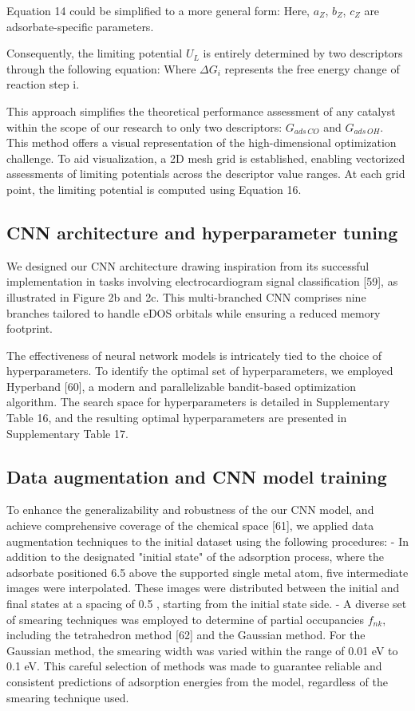 Equation 14 could be simplified to a more general form:
Here, $a_Z$, $b_Z$, $c_Z$ are adsorbate-specific parameters.

Consequently, the limiting potential $\textit{U}_{L}$ is entirely determined by two descriptors through the following equation:
Where $\Delta G_{i}$ represents the free energy change of reaction step i.

This approach simplifies the theoretical performance assessment of any catalyst within the scope of our research to only two descriptors: $G_{\textit{ads} \, \textit{CO}}$ and $G_{\textit{ads} \, \textit{OH}}$.
This method offers a visual representation of the high-dimensional optimization challenge.
To aid visualization, a 2D mesh grid is established, enabling vectorized assessments of limiting potentials across the descriptor value ranges.
At each grid point, the limiting potential is computed using Equation 16.


\subsection{CNN architecture and hyperparameter tuning}
We designed our CNN architecture drawing inspiration from its successful implementation in tasks involving electrocardiogram signal classification [59], as illustrated in Figure 2b and 2c.
This multi-branched CNN comprises nine branches tailored to handle eDOS orbitals while ensuring a reduced memory footprint.

The effectiveness of neural network models is intricately tied to the choice of hyperparameters.
To identify the optimal set of hyperparameters, we employed Hyperband [60], a modern and parallelizable bandit-based optimization algorithm.
The search space for hyperparameters is detailed in Supplementary Table 16, and the resulting optimal hyperparameters are presented in Supplementary Table 17.


\subsection{Data augmentation and CNN model training}
To enhance the generalizability and robustness of the our CNN model, and achieve comprehensive coverage of the chemical space [61], we applied data augmentation techniques to the initial dataset using the following procedures:
	- In addition to the designated "initial state" of the adsorption process, where the adsorbate positioned 6.5 \text{\AA} above the supported single metal atom, five intermediate images were interpolated. These images were distributed between the initial and final states at a spacing of 0.5 \text{\AA}, starting from the initial state side.
	- A diverse set of smearing techniques was employed to determine of partial occupancies $f_{nk}$, including the tetrahedron method [62] and the Gaussian method. For the Gaussian method, the smearing width was varied within the range of 0.01 eV to 0.1 eV. This careful selection of methods was made to guarantee reliable and consistent predictions of adsorption energies from the model, regardless of the smearing technique used.

